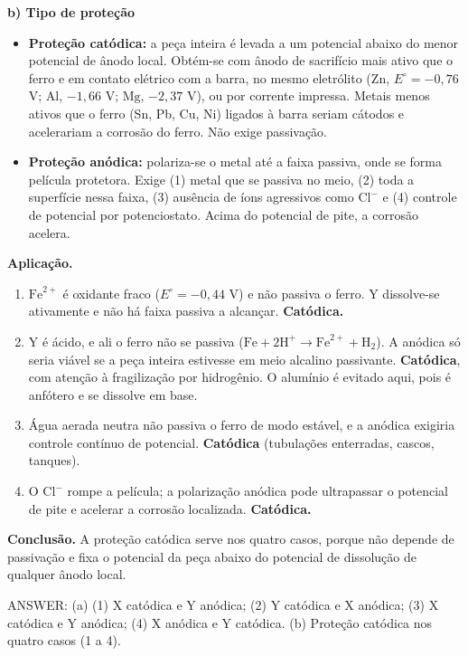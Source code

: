 \documentclass{article}%
\begin{document}
\textbf{b) Tipo de proteção}

\begin{itemize}
\item \textbf{Proteção catódica:} a peça inteira é levada a um potencial abaixo do menor potencial de ânodo local. Obtém-se com ânodo de sacrifício mais ativo que o ferro e em contato elétrico com a barra, no mesmo eletrólito ($\mathrm{Zn}$, $E^\circ = -0{,}76$ V; $\mathrm{Al}$, $-1{,}66$ V; $\mathrm{Mg}$, $-2{,}37$ V), ou por corrente impressa. Metais menos ativos que o ferro (Sn, Pb, Cu, Ni) ligados à barra seriam cátodos e acelerariam a corrosão do ferro. Não exige passivação.
\item \textbf{Proteção anódica:} polariza-se o metal até a faixa passiva, onde se forma película protetora. Exige (1) metal que se passiva no meio, (2) toda a superfície nessa faixa, (3) ausência de íons agressivos como $\mathrm{Cl}^-$ e (4) controle de potencial por potenciostato. Acima do potencial de pite, a corrosão acelera.
\end{itemize}

\textbf{Aplicação.}
\begin{enumerate}
\item $\mathrm{Fe}^{2+}$ é oxidante fraco ($E^\circ = -0{,}44$ V) e não passiva o ferro. Y dissolve-se ativamente e não há faixa passiva a alcançar. \textbf{Catódica.}
\item Y é ácido, e ali o ferro não se passiva ($\mathrm{Fe} + 2\mathrm{H}^+ \rightarrow \mathrm{Fe}^{2+} + \mathrm{H}_2$). A anódica só seria viável se a peça inteira estivesse em meio alcalino passivante. \textbf{Catódica}, com atenção à fragilização por hidrogênio. O alumínio é evitado aqui, pois é anfótero e se dissolve em base.
\item Água aerada neutra não passiva o ferro de modo estável, e a anódica exigiria controle contínuo de potencial. \textbf{Catódica} (tubulações enterradas, cascos, tanques).
\item O $\mathrm{Cl}^-$ rompe a película; a polarização anódica pode ultrapassar o potencial de pite e acelerar a corrosão localizada. \textbf{Catódica.}
\end{enumerate}

\textbf{Conclusão.} A proteção catódica serve nos quatro casos, porque não depende de passivação e fixa o potencial da peça abaixo do potencial de dissolução de qualquer ânodo local.

ANSWER: (a) (1) X catódica e Y anódica; (2) Y catódica e X anódica; (3) X catódica e Y anódica; (4) X anódica e Y catódica. (b) Proteção catódica nos quatro casos (1 a 4).%
\newpage%
\end{document}
